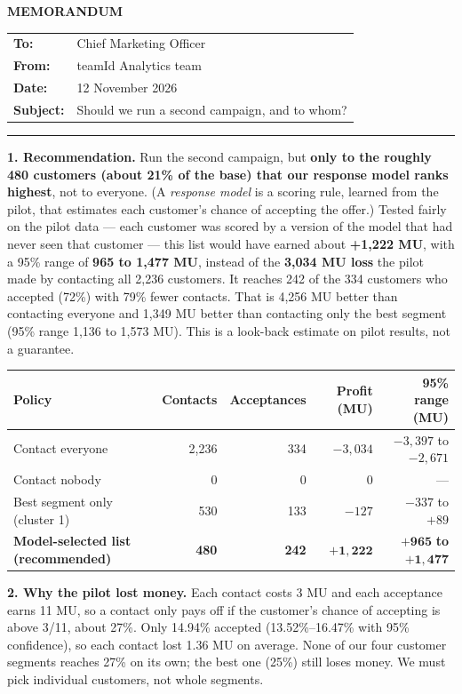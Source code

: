 \documentclass[11pt]{article}
\begin{document}
{\Large\bfseries MEMORANDUM}\par\smallskip
\begin{tabular}{@{}ll}
\textbf{To:} & Chief Marketing Officer\\
\textbf{From:} & teamId Analytics team\\
\textbf{Date:} & 12 November 2026\\
\textbf{Subject:} & Should we run a second campaign, and to whom?
\end{tabular}\par\hrule\medskip

\textbf{1. Recommendation.} Run the second campaign, but \textbf{only to the roughly 480 customers (about 21\% of the base) that our response model ranks highest}, not to everyone. (A \emph{response model} is a scoring rule, learned from the pilot, that estimates each customer's chance of accepting the offer.) Tested fairly on the pilot data --- each customer was scored by a version of the model that had never seen that customer --- this list would have earned about \textbf{+1,222 MU}, with a 95\% range of \textbf{965 to 1,477 MU}, instead of the \textbf{3,034 MU loss} the pilot made by contacting all 2,236 customers. It reaches 242 of the 334 customers who accepted (72\%) with 79\% fewer contacts. That is 4,256 MU better than contacting everyone and 1,349 MU better than contacting only the best segment (95\% range 1,136 to 1,573 MU). This is a look-back estimate on pilot results, not a guarantee.

\begin{center}\small
\begin{tabular}{lrrrr}
\toprule
Policy & Contacts & Acceptances & Profit (MU) & 95\% range (MU)\\
\midrule
Contact everyone & 2,236 & 334 & $-3{,}034$ & $-3{,}397$ to $-2{,}671$\\
Contact nobody & 0 & 0 & 0 & ---\\
Best segment only (cluster 1) & 530 & 133 & $-127$ & $-337$ to $+89$\\
\textbf{Model-selected list (recommended)} & \textbf{480} & \textbf{242} & $\mathbf{+1{,}222}$ & $\mathbf{+965}$ \textbf{to} $\mathbf{+1{,}477}$\\
\bottomrule
\end{tabular}\end{center}

\textbf{2. Why the pilot lost money.} Each contact costs 3 MU and each acceptance earns 11 MU, so a contact only pays off if the customer's chance of accepting is above 3/11, about 27\%. Only 14.94\% accepted (13.52\%--16.47\% with 95\% confidence), so each contact lost 1.36 MU on average. None of our four customer segments reaches 27\% on its own; the best one (25\%) still loses money. We must pick individual customers, not whole segments.
\end{document}
